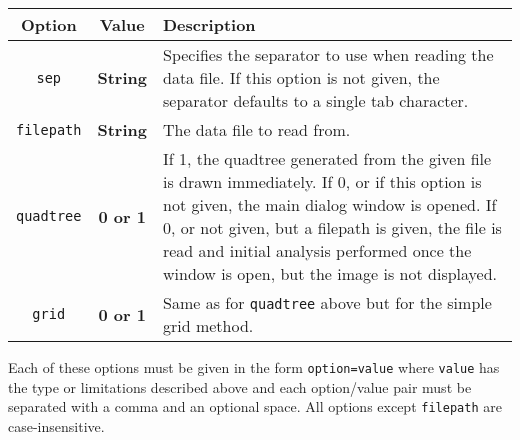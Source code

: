\tabulinesep=1.2mm
\begin{tabu}{c c X}
	\toprule
	Option & Value & Description \\
	\midrule
	\texttt{sep} & \textbf{String} & Specifies the separator to use when
		reading the data file. If this option is not given, the separator
		defaults to a single tab character. \\
	\texttt{filepath} & \textbf{String} & The data file to read from. \\
	\texttt{quadtree} & \textbf{0 or 1} & If 1, the quadtree generated from
		the given file is drawn immediately. If 0, or if this option is not
		given, the main dialog window is opened. If 0, or not given, but a
		filepath is given, the file is read and initial analysis performed once
		the window is open, but the image is not displayed. \\
	\texttt{grid} & \textbf{0 or 1} & Same as for \texttt{quadtree} above
		but for the simple grid method. \\
	\bottomrule
\end{tabu}

Each of these options must be given in the form \texttt{option=value} where
\texttt{value} has the type or limitations described above and each
option/value pair must be separated with a comma and an optional space. All
options except \texttt{filepath} are case-insensitive.
